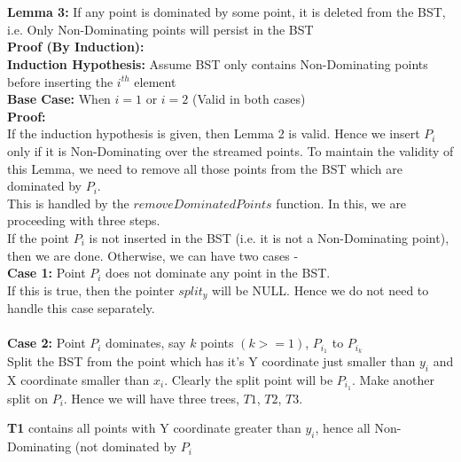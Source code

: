 \documentclass{article}
\begin{document}
                \\
                \\
                \textbf{Lemma 3:} If any point is dominated by some point, it is deleted from the BST, i.e. Only Non-Dominating points will persist in the BST
                \\
                \textbf{Proof (By Induction):}
                \\
                \textbf{Induction Hypothesis:} Assume BST only contains Non-Dominating points before inserting the $i^{th}$ element
                \\
                \textbf{Base Case:} When $i = 1$ or $i = 2$ (Valid in both cases)
                \\
                \textbf{Proof:}
                \\
                If the induction hypothesis is given, then Lemma 2 is valid. Hence we insert $P_i$ only if it is Non-Dominating over the streamed points. To maintain the validity of this Lemma, we need to remove all those points from the BST which are dominated by $P_i$.
                \\
                This is handled by the $removeDominatedPoints$ function. In this, we are proceeding with three steps.
                \\
                If the point $P_i$ is not inserted in the BST (i.e. it is not a Non-Dominating point), then we are done. Otherwise, we can have two cases -
                \\
                \textbf{Case 1:} Point $P_i$ does not dominate any point in the BST.
                \\
                If this is true, then the pointer $split_y$ will be NULL. Hence we do not need to handle this case separately.
                \\
                \\
                \textbf{Case 2:} Point $P_i$ dominates, say $k$ points $(k >= 1)$, $P_{i_1}$ to $P_{i_k}$
                \\
                Split the BST from the point which has it's Y coordinate just smaller than $y_i$ and X coordinate smaller than $x_i$. Clearly the split point will be $P_{i_1}$. Make another split on $P_i$. Hence we will have three trees, $T1$, $T2$, $T3$.
                
                \textbf{T1} contains all points with Y coordinate greater than $y_i$, hence all Non-Dominating (not dominated by $P_i$
                
\end{document}
